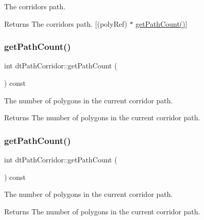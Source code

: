 The corridor\textquotesingle{}s path. \begin{DoxyReturn}{Returns}
The corridor\textquotesingle{}s path. \mbox{[}(poly\+Ref) $\ast$ \hyperlink{classdtPathCorridor_a16bfdb275fb8f385c269cd06236f8213}{get\+Path\+Count()}\mbox{]} 
\end{DoxyReturn}
\mbox{\label{classdtPathCorridor_a16bfdb275fb8f385c269cd06236f8213}} 
\subsubsection{\texorpdfstring{get\+Path\+Count()}{getPathCount()}\hspace{0.1cm}{\footnotesize\ttfamily [1/2]}}
{\footnotesize\ttfamily int dt\+Path\+Corridor\+::get\+Path\+Count (\begin{DoxyParamCaption}{ }\end{DoxyParamCaption}) const\hspace{0.3cm}{\ttfamily [inline]}}

The number of polygons in the current corridor path. \begin{DoxyReturn}{Returns}
The number of polygons in the current corridor path. 
\end{DoxyReturn}
\mbox{\label{classdtPathCorridor_a16bfdb275fb8f385c269cd06236f8213}} 
\subsubsection{\texorpdfstring{get\+Path\+Count()}{getPathCount()}\hspace{0.1cm}{\footnotesize\ttfamily [2/2]}}
{\footnotesize\ttfamily int dt\+Path\+Corridor\+::get\+Path\+Count (\begin{DoxyParamCaption}{ }\end{DoxyParamCaption}) const\hspace{0.3cm}{\ttfamily [inline]}}

The number of polygons in the current corridor path. \begin{DoxyReturn}{Returns}
The number of polygons in the current corridor path. 
\end{DoxyReturn}
\mbox{\label{classdtPathCorridor_a607e96864c9cb68386d57e90d8681159}} 
